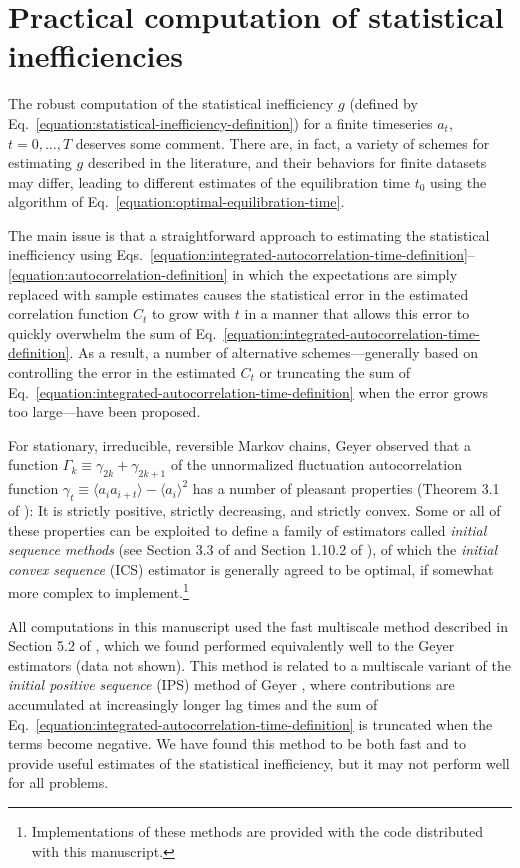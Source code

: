 \documentclass[aps,pre,twocolumn,nofootinbib,superscriptaddress,linenumbers,11point]{revtex4-1}
\newcommand{\expect}[1]{\langle #1 \rangle}                %
\begin{document}
\section*{Practical computation of statistical inefficiencies}

The robust computation of the statistical inefficiency $g$ (defined by Eq.~\ref{equation:statistical-inefficiency-definition}) for a finite timeseries $a_t$, $t = 0, \ldots, T$ deserves some comment.
There are, in fact, a variety of schemes for estimating $g$ described in the literature, and their behaviors for finite datasets may differ, leading to different estimates of the equilibration time $t_0$ using the algorithm of Eq.~\ref{equation:optimal-equilibration-time}.

The main issue is that a straightforward approach to estimating the statistical inefficiency using Eqs.~\ref{equation:integrated-autocorrelation-time-definition}--\ref{equation:autocorrelation-definition} in which the expectations are simply replaced with sample estimates causes the statistical error in the estimated correlation function $C_t$ to grow with $t$ in a manner that allows this error to quickly overwhelm the sum of Eq.~\ref{equation:integrated-autocorrelation-time-definition}.
As a result, a number of alternative schemes---generally based on controlling the error in the estimated $C_t$ or truncating the sum of Eq.~\ref{equation:integrated-autocorrelation-time-definition} when the error grows too large---have been proposed.

For stationary, irreducible, reversible Markov chains, Geyer observed that a function $\Gamma_{k} \equiv \gamma_{2k} + \gamma_{2k+1}$ of the unnormalized fluctuation autocorrelation function $\gamma_t \equiv \expect{a_i a_{i+t}} - \expect{a_i}^2$ has a number of pleasant properties (Theorem 3.1 of \cite{geyer:1992:stat-sci:practical-mcmc}): It is strictly positive, strictly decreasing, and strictly convex.
Some or all of these properties can be exploited to define a family of estimators called \emph{initial sequence methods} (see Section 3.3 of \cite{geyer:1992:stat-sci:practical-mcmc} and Section 1.10.2 of \cite{crc-mcmc-handbook}), of which the \emph{initial convex sequence} (ICS) estimator is generally agreed to be optimal, if somewhat more complex to implement.\footnote{Implementations of these methods are provided with the code distributed with this manuscript.}

All computations in this manuscript used the fast multiscale method described in Section 5.2 of \citep{chodera:jctc:2007:wham}, which we found performed equivalently well to the Geyer estimators (data not shown).
This method is related to a multiscale variant of the \emph{initial positive sequence} (IPS) method of Geyer \cite{geyer-thompson:j-royal-stat-soc-b:1992:initial-sequence-estimators}, where contributions are accumulated at increasingly longer lag times and the sum of Eq.~\ref{equation:integrated-autocorrelation-time-definition} is truncated when the terms become negative.
We have found this method to be both fast and to provide useful estimates of the statistical inefficiency, but it may not perform well for all problems.
\end{document}

